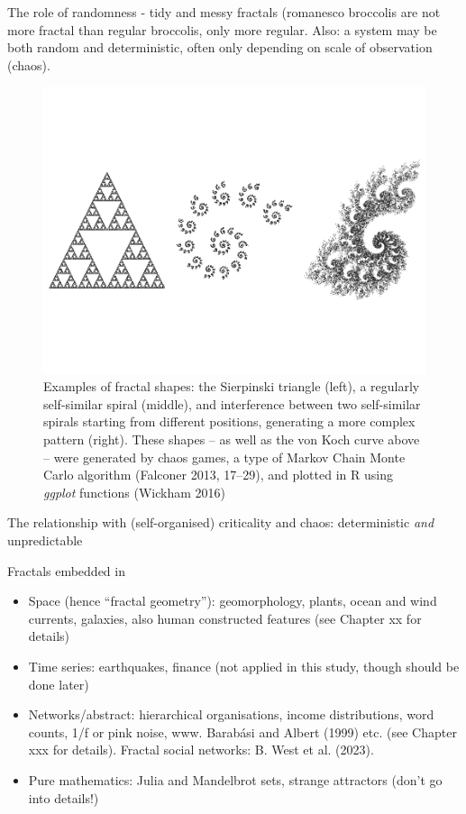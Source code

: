 \documentclass[
  12pt,
  a4paper, twoside]{book}
\begin{document}
The role of randomness - tidy and messy fractals (romanesco broccolis are not more fractal than regular broccolis, only more regular. Also: a system may be both random and deterministic, often only depending on scale of observation (chaos).



\begin{figure}

{\centering \includegraphics[width=0.9\linewidth]{bookdown-demo_files/figure-latex/02-fractals-1} 

}

\caption[Examples of fractal shapes]{Examples of fractal shapes: the Sierpinski triangle (left), a regularly self-similar spiral (middle), and interference between two self-similar spirals starting from different positions, generating a more complex pattern (right). These shapes -- as well as the von Koch curve above -- were generated by chaos games, a type of Markov Chain Monte Carlo algorithm (Falconer 2013, 17--29), and plotted in R using \emph{ggplot} functions (Wickham 2016)}\label{fig:02-fractals}
\end{figure}

The relationship with (self-organised) criticality and chaos: deterministic \emph{and} unpredictable

Fractals embedded in

\begin{itemize}
\item
  Space (hence ``fractal geometry''): geomorphology, plants, ocean and wind currents, galaxies, also human constructed features (see Chapter xx for details)
\item
  Time series: earthquakes, finance (not applied in this study, though should be done later)
\item
  Networks/abstract: hierarchical organisations, income distributions, word counts, 1/f or pink noise, www. Barabási and Albert (1999) etc. (see Chapter xxx for details). Fractal social networks: B. West et al. (2023).
\item
  Pure mathematics: Julia and Mandelbrot sets, strange attractors (don't go into details!)
\end{itemize}
\end{document}
